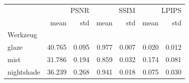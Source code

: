 \begin{tabular}{lrrrrrr}
\toprule
 & \multicolumn{2}{r}{PSNR} & \multicolumn{2}{r}{SSIM} & \multicolumn{2}{r}{LPIPS} \\
 & mean & std & mean & std & mean & std \\
Werkzeug &  &  &  &  &  &  \\
\midrule
glaze & 40.765 & 0.095 & 0.977 & 0.007 & 0.020 & 0.012 \\
mist & 31.786 & 0.194 & 0.859 & 0.032 & 0.174 & 0.081 \\
nightshade & 36.239 & 0.268 & 0.941 & 0.018 & 0.075 & 0.030 \\
\bottomrule
\end{tabular}
